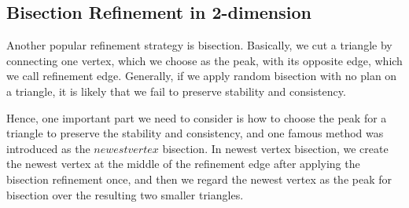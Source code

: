     \subsection{Bisection Refinement in 2-dimension}
    Another popular refinement strategy is bisection. Basically, we cut a triangle by connecting one vertex, which we choose as the peak, with its opposite edge, which we call refinement edge. Generally, if we apply random bisection with no plan on a triangle, it is likely that we fail to preserve stability and consistency.

    Hence, one important part we need to consider is how to choose the peak for a triangle to preserve the stability and consistency, and one famous method was introduced as the $newest vertex$ bisection. In newest vertex bisection, we create the newest vertex at the middle of the refinement edge after applying the bisection refinement once, and then we regard the newest vertex as the peak for bisection over the resulting two smaller triangles.

